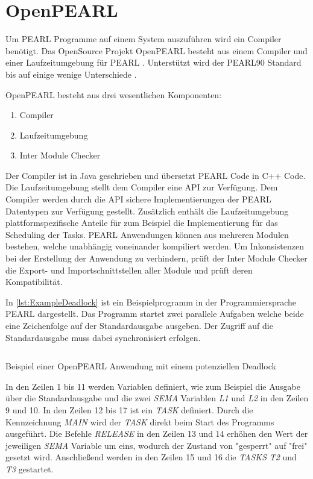 \section{OpenPEARL}
\label{section:OpenPEARL}
Um PEARL Programme auf einem System auszuführen wird ein Compiler benötigt.
Das OpenSource Projekt OpenPEARL besteht aus einem Compiler und einer Laufzeitumgebung für PEARL \autocite{OpenPEARL}. Unterstützt wird der PEARL90 Standard bis auf einige wenige Unterschiede \autocite{OpenPEARL_Differences_To_PEARL90}.

OpenPEARL besteht aus drei wesentlichen Komponenten:
\begin{enumerate}
  \item Compiler
  \item Laufzeitumgebung
  \item Inter Module Checker
\end{enumerate}
Der Compiler ist in Java geschrieben und übersetzt PEARL Code in C++ Code. Die Laufzeitumgebung stellt dem Compiler eine API zur Verfügung. Dem Compiler werden durch die API sichere Implementierungen der PEARL Datentypen zur Verfügung gestellt. Zusätzlich enthält die Laufzeitumgebung plattformspezifische Anteile für zum Beispiel die Implementierung für das Scheduling der Tasks. PEARL Anwendungen können aus mehreren Modulen bestehen, welche unabhängig voneinander kompiliert werden. Um Inkonsistenzen bei der Erstellung der Anwendung zu verhindern, prüft der Inter Module Checker die Export- und Importschnittstellen aller Module und prüft deren Kompatibilität.

In \cref{lst:ExampleDeadlock} ist ein Beispielprogramm in der Programmiersprache
PEARL dargestellt. Das Programm startet zwei parallele Aufgaben welche beide eine Zeichenfolge auf der Standardausgabe ausgeben. Der Zugriff auf die Standardausgabe muss dabei synchronisiert erfolgen.

\begin{listing}[ht]
  \inputminted[frame=lines,linenos]{vim}{./Examples/Example_Deadlock.prl}
  \caption{Beispiel einer OpenPEARL Anwendung mit einem potenziellen Deadlock}
  \label{lst:ExampleDeadlock}   
\end{listing} 

In den Zeilen 1 bis 11 werden Variablen definiert, wie zum Beispiel die Ausgabe über die Standardausgabe und die zwei \textit{SEMA} Variablen \textit{L1} und \textit{L2} in den Zeilen 9 und 10. In den Zeilen 12 bis 17 ist ein \textit{TASK} definiert. Durch die Kennzeichnung \textit{MAIN} wird der \textit{TASK} direkt beim Start des Programms ausgeführt. Die Befehle \textit{RELEASE} in den Zeilen 13 und 14 erhöhen den Wert der jeweiligen \textit{SEMA} Variable um eins, wodurch der Zustand von "gesperrt" auf "frei" gesetzt wird. Anschließend werden in den Zeilen 15 und 16 die \textit{TASKS} \textit{T2} und \textit{T3} gestartet.

